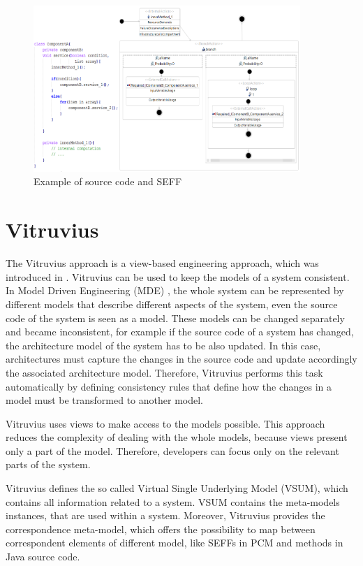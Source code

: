\begin{figure}[h]
\centering
\includegraphics[width=0.9\textwidth]{figures/code_seff}
\caption{Example of source code and SEFF}
\label{fig:Example of source code and SEFF}
\end{figure}


\section{Vitruvius}
\label{sec:Vitruvius}

The Vitruvius approach is a view-based \cite{goldschmidt2012view} engineering approach, which was introduced in \cite{burger2013flexible, kramer2013view}.  Vitruvius can be used to keep the models of a system consistent. In Model Driven Engineering (MDE) \cite{thomas2005erzeugung}, the whole system can be represented by different models that describe different aspects of the system, even the source code of the system is seen as a model. These models can be changed separately and became inconsistent, for example if the source code of a system has changed, the architecture model of the system has to be also updated. In this case, architectures must capture the changes in the source code and update accordingly the associated architecture model. Therefore, Vitruvius performs this task automatically by defining consistency rules that define how the changes in a model must be transformed to another model.

Vitruvius uses views to make access to the models possible. This approach reduces the complexity of dealing with the whole models, because views present only a part of the model. Therefore, developers can focus only on the relevant parts of the system.

Vitruvius defines the so called Virtual Single Underlying Model (VSUM), which contains all information related to a system. VSUM contains the meta-models instances, that are used within a system. Moreover, Vitruvius provides the correspondence meta-model, which offers the possibility to map between correspondent elements of different model, like SEFFs in PCM and methods in Java source code.  


